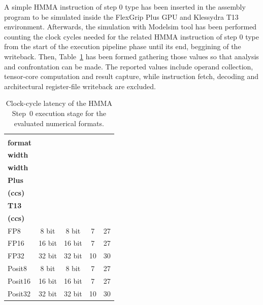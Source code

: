 A simple HMMA instruction of step 0 type has been inserted in the assembly program to be simulated inside the FlexGrip Plus GPU and Klessydra T13 environment. Afterwards, the simulation with Modelsim tool has been performed counting the clock cycles needed for the related HMMA instruction of step 0 type from the start of the execution pipeline phase until its end, beggining of the writeback. Then, Table~\ref{tab:HMMA_step0_latency} has been formed gathering those values so that analysis and confrontation can be made. The reported values include operand collection, tensor-core computation and result capture, while instruction fetch, decoding and architectural register-file writeback are excluded.

\begin{table}[htbp]
    \centering
    \caption{Clock-cycle latency of the HMMA Step~0 execution
    stage for the evaluated numerical formats.}
    \label{tab:HMMA_step0_latency}

    \begin{tabular}{lcccc}
        \toprule
        \shortstack{\textbf{Numerical}\\\textbf{format}}
        & \shortstack{\textbf{Operand}\\\textbf{width}}
        & \shortstack{\textbf{Result}\\\textbf{width}}
        & \shortstack{\textbf{FlexGrip}\\\textbf{Plus}\\\textbf{(ccs)}}
        & \shortstack{\textbf{Klessydra}\\\textbf{T13}\\\textbf{(ccs)}} \\
        \midrule

        FP8
        & 8 bit
        & 8 bit
        & 7
        & 27 \\

        FP16
        & 16 bit
        & 16 bit
        & 7
        & 27 \\

        FP32
        & 32 bit
        & 32 bit
        & 10
        & 30 \\

        Posit8
        & 8 bit
        & 8 bit
        & 7
        & 27 \\

        Posit16
        & 16 bit
        & 16 bit
        & 7
        & 27 \\

        Posit32
        & 32 bit
        & 32 bit
        & 10
        & 30 \\


\end{tabular}
\end{table}
